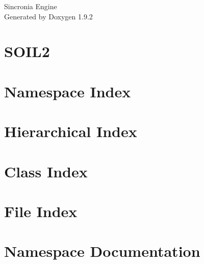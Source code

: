 \documentclass[twoside]{book}
\newcommand{\+}{\discretionary{\mbox{\scriptsize$\hookleftarrow$}}{}{}}
\newcommand{\clearemptydoublepage}{%
    \newpage{\pagestyle{empty}\cleardoublepage}%
  }
\begin{document}
  \raggedbottom
    \hypersetup{pageanchor=false,
                bookmarksnumbered=true,
                pdfencoding=unicode
               }
  \begin{titlepage}
  \vspace*{7cm}
  \begin{center}%
  {\Large Sincronia Engine}\\
  \vspace*{1cm}
  {\large Generated by Doxygen 1.9.2}\\
  \end{center}
  \end{titlepage}
  \clearemptydoublepage
  \tableofcontents
  \clearemptydoublepage
  \hypersetup{pageanchor=true}
\chapter{SOIL2}
\label{index}\hypertarget{index}{}
\chapter{Namespace Index}

\chapter{Hierarchical Index}

\chapter{Class Index}

\chapter{File Index}

\chapter{Namespace Documentation}




\end{document}
